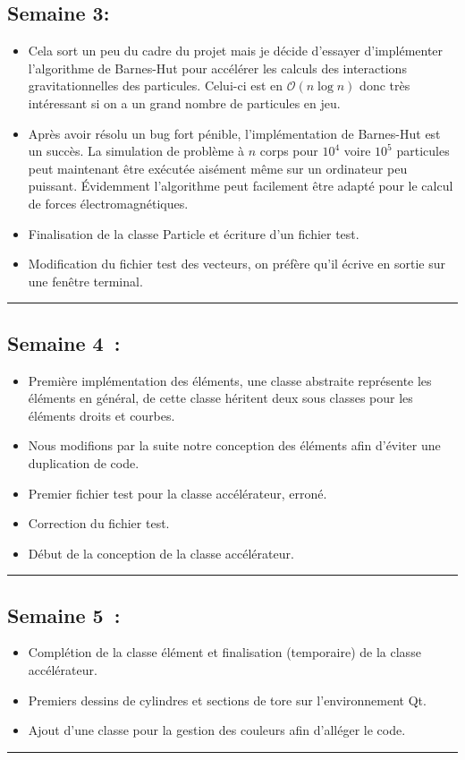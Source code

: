 \documentclass[12pt, letterpaper, twoside]{article}
\begin{document}
\subsection{Semaine 3:}
\begin{itemize}
\item Cela sort un peu du cadre du projet mais je décide d'essayer d'implémenter l'algorithme de Barnes-Hut pour accélérer les calculs des interactions gravitationnelles des particules. Celui-ci est en  $\mathcal{O}(n\log{n})$ donc très intéressant si on a un grand nombre de particules en jeu.

\item Après avoir résolu un bug fort pénible, l'implémentation de Barnes-Hut est un succès. La simulation de problème à $n$ corps pour $10^4$ voire $10^5$ particules peut maintenant être exécutée aisément même sur un ordinateur peu puissant. Évidemment l'algorithme peut facilement être adapté pour le calcul de forces électromagnétiques.

\item Finalisation de la classe Particle et écriture d'un fichier test. 
\item Modification du fichier test des vecteurs, on préfère qu'il écrive en sortie sur une fenêtre terminal.
\end{itemize}

\rule{\textwidth}{0.4pt}

\subsection{Semaine 4 :}

\begin{itemize}
\item Première implémentation des éléments, une classe abstraite représente les éléments en général, de cette classe héritent deux sous classes pour les éléments droits et courbes.
\item Nous modifions par la suite notre conception des éléments afin d'éviter une duplication de code.
\item Premier fichier test pour la classe accélérateur, erroné.
\item Correction du fichier test.
\item Début de la conception de la classe accélérateur.
\end{itemize}

\rule{\textwidth}{0.4pt}

\subsection{Semaine 5 :}
\begin{itemize}
\item Complétion de la classe élément et finalisation (temporaire) de la classe accélérateur.
\item Premiers dessins de cylindres et sections de tore sur l’environnement Qt.
\item Ajout d’une classe pour la gestion des couleurs afin d’alléger le code.
\end{itemize}
\rule{\textwidth}{0.4pt}
\end{document}
